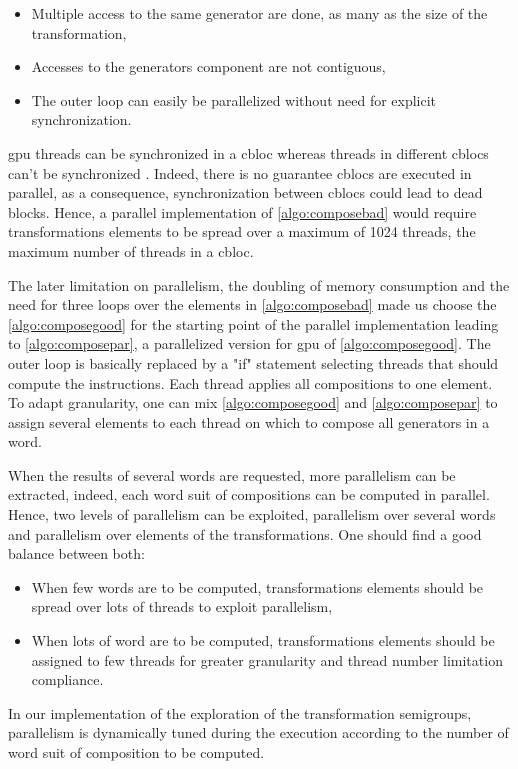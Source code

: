 {\begin{itemize}
 \item Multiple access to the same generator are done, as many as the size of the transformation,
 \item Accesses to the generators component are not contiguous,
 \item The outer loop can easily be parallelized without need for explicit synchronization.
\end{itemize}
\gls{gpu} threads can be synchronized in a \gls{cbloc} whereas threads in different \glspl{cbloc} can't be synchronized \cite{doccuda}. 
Indeed, there is no guarantee \glspl{cbloc} are executed in parallel, as a consequence, synchronization between \glspl{cbloc} could lead to dead blocks. 
Hence, a parallel implementation of \autoref{algo:composebad} would require transformations elements to be spread over a maximum of 1024 threads, the maximum number of threads in a \gls{cbloc}.

The later limitation on parallelism, the doubling of memory consumption and the need for three loops over the elements in \autoref{algo:composebad} 
made us choose the \autoref{algo:composegood} for the starting point of the parallel implementation leading to 
\autoref{algo:composepar}, a parallelized version for \gls{gpu} of \autoref{algo:composegood}. 
The outer loop is basically replaced by a "if" statement selecting threads that should compute the instructions. Each thread applies all compositions to one element.
To adapt granularity, one can mix \autoref{algo:composegood} and \autoref{algo:composepar} to assign several elements to each thread on which to compose all generators in a word.

When the results of several words are requested, more parallelism can be extracted, indeed, each word suit of compositions can be computed in parallel. 
Hence, two levels of parallelism can be exploited, parallelism over several words and parallelism over elements of the transformations. One should find a good balance between both:
\begin{itemize}
\item When few words are to be computed, transformations elements should be spread over lots of threads to exploit parallelism,
\item When lots of word are to be computed, transformations elements should be assigned to few threads for greater granularity and thread number limitation compliance.
\end{itemize}
In our implementation of the exploration of the transformation semigroups, parallelism is dynamically tuned during the execution according to the number of word suit of composition to be computed.



}
